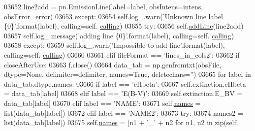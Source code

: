 \begin{DoxyCode}
{{{{{{{{{{{{{{{{{{{{{{03652                         line2add = pn.EmissionLine(label=label, obsIntens=intens, obsError=error)
03653                     \textcolor{keywordflow}{except}:
03654                         self.log\_.warn(\textcolor{stringliteral}{'Unknown line label \{0\}'}.format(label), calling=self.
      \hyperlink{classpyneb_1_1core_1_1pynebcore_1_1_observation_a2639fad9af4fefad20e4097295bd40e7}{calling})
03655                     \textcolor{keywordflow}{try}:
03656                         self.\hyperlink{classpyneb_1_1core_1_1pynebcore_1_1_observation_a5f4b01dbeb8d50963fb7fa21b94bfc17}{addLine}(line2add)
03657                         self.log\_.message(\textcolor{stringliteral}{'adding line \{0\}'}.format(label), calling=self.
      \hyperlink{classpyneb_1_1core_1_1pynebcore_1_1_observation_a2639fad9af4fefad20e4097295bd40e7}{calling})
03658                     \textcolor{keywordflow}{except}:
03659                         self.log\_.warn(\textcolor{stringliteral}{'Impossible to add line'}.format(label), calling=self.
      \hyperlink{classpyneb_1_1core_1_1pynebcore_1_1_observation_a2639fad9af4fefad20e4097295bd40e7}{calling})
03660                         
03661         \textcolor{keywordflow}{elif} fileFormat == \textcolor{stringliteral}{'lines\_in\_cols2'}:
03662             \textcolor{keywordflow}{if} closeAfterUse:
03663                 f.close()
03664             data\_tab = np.genfromtxt(obsFile, dtype=\textcolor{keywordtype}{None}, delimiter=delimiter, names=\textcolor{keyword}{True}, deletechars=\textcolor{stringliteral}{''})
03665             \textcolor{keywordflow}{for} label \textcolor{keywordflow}{in} data\_tab.dtype.names:
03666                 \textcolor{keywordflow}{if} label == \textcolor{stringliteral}{'cHbeta'}:
03667                     self.extinction.cHbeta = data\_tab[label]
03668                 \textcolor{keywordflow}{elif} label == \textcolor{stringliteral}{'E(B-V)'}:
03669                     self.extinction.E\_BV = data\_tab[label]
03670                 \textcolor{keywordflow}{elif} label == \textcolor{stringliteral}{'NAME'}:
03671                     self.\hyperlink{classpyneb_1_1core_1_1pynebcore_1_1_observation_a3f365d0b1488b2eba300bf71caf23c17}{names} = list(data\_tab[label])
03672                 \textcolor{keywordflow}{elif} label == \textcolor{stringliteral}{'NAME2'}:
03673                     \textcolor{keywordflow}{try}:
03674                         names2 = list(data\_tab[label])
03675                         self.\hyperlink{classpyneb_1_1core_1_1pynebcore_1_1_observation_a3f365d0b1488b2eba300bf71caf23c17}{names} = [n1 + \textcolor{stringliteral}{'\_'} + n2 \textcolor{keywordflow}{for} n1, n2 \textcolor{keywordflow}{in} zip(self.
}}}}}}}}}}}}}}}}}}}}}}
\end{DoxyCode}
